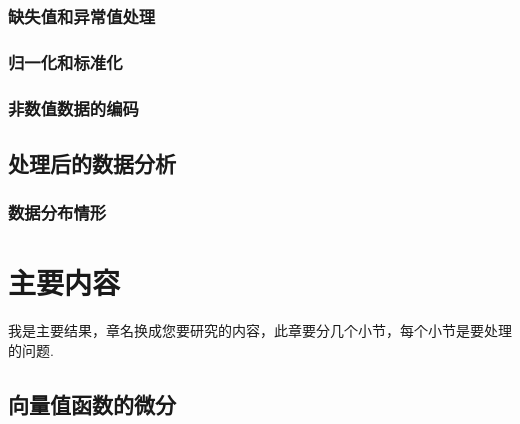 \subsection{缺失值和异常值处理}

\subsection{归一化和标准化}

\subsection{非数值数据的编码}

\section{处理后的数据分析}

\subsection{数据分布情形}

\chapter{主要内容}

我是主要结果，章名换成您要研究的内容，此章要分几个小节，每个小节是要处理的问题.

\section{向量值函数的微分}

